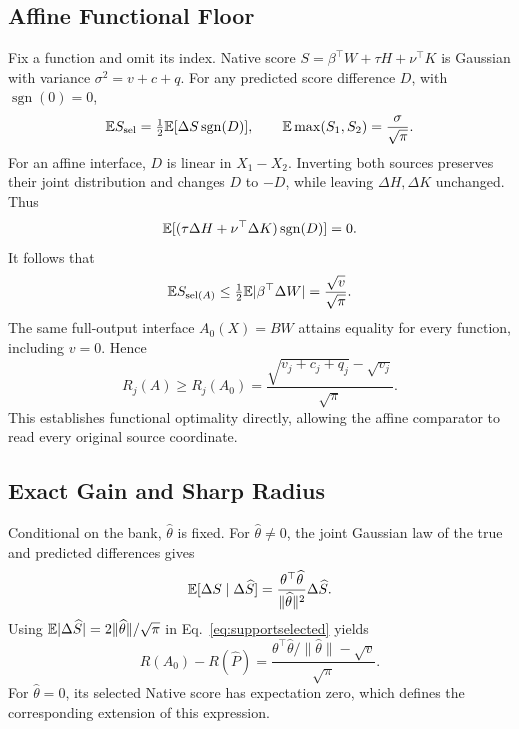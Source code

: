 \subsection{Affine Functional Floor}
Fix a function and omit its index. Native score $S=\beta^\top W+\tau H+\nu^\top K$ is Gaussian with variance $\sigma^2=v+c+q$. For any predicted score difference $D$, with $\operatorname{sgn}(0)=0$,
\begin{equation}
 \mathbb E S_{\operatorname{sel}}=\tfrac12\mathbb E[\Delta S\operatorname{sgn}(D)],
 \qquad \mathbb E\max(S_1,S_2)=\frac{\sigma}{\sqrt\pi}.
 \label{eq:supportselected}
\end{equation}
For an affine interface, $D$ is linear in $X_1-X_2$. Inverting both sources preserves their joint distribution and changes $D$ to $-D$, while leaving $\Delta H,\Delta K$ unchanged. Thus
\begin{equation}
 \mathbb E[(\tau\Delta H+\nu^\top\Delta K)\operatorname{sgn}(D)]=0.
\end{equation}
It follows that
\begin{equation}
 \mathbb E S_{\operatorname{sel}(A)}
 \le\tfrac12\mathbb E|\beta^\top\Delta W|=\frac{\sqrt v}{\sqrt\pi}.
\end{equation}
The same full-output interface $A_0(X)=BW$ attains equality for every function, including $v=0$. Hence
\begin{equation}
 R_j(A)\ge R_j(A_0)
 =\frac{\sqrt{v_j+c_j+q_j}-\sqrt{v_j}}{\sqrt\pi}.
 \label{eq:affinefloor}
\end{equation}
This establishes functional optimality directly, allowing the affine comparator to read every original source coordinate.

\subsection{Exact Gain and Sharp Radius}
Conditional on the bank, $\widehat\theta$ is fixed. For $\widehat\theta\ne0$, the joint Gaussian law of the true and predicted differences gives
\begin{equation}
 \mathbb E[\Delta S\mid\Delta\widehat S]
 =\frac{\theta^\top\widehat\theta}{\|\widehat\theta\|^2}\Delta\widehat S.
\end{equation}
Using $\mathbb E|\Delta\widehat S|=2\|\widehat\theta\|/\sqrt\pi$ in Eq.~\eqref{eq:supportselected} yields
\begin{equation}
 R(A_0)-R(\widehat P)
 =\frac{\theta^\top\widehat\theta/\|\widehat\theta\|-\sqrt v}{\sqrt\pi}.
 \label{eq:exactsupportgain}
\end{equation}
For $\widehat\theta=0$, its selected Native score has expectation zero, which defines the corresponding extension of this expression.

